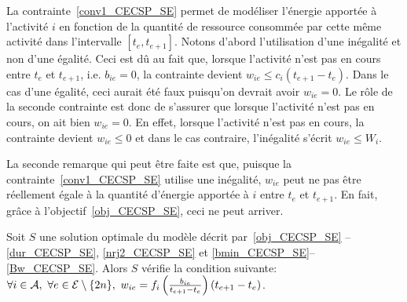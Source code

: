 La contrainte~\eqref{conv1_CECSP_SE} permet de modéliser l'énergie
apportée à l'activité $i$ en fonction de la quantité de ressource
consommée par cette même activité dans l'intervalle
$[t_e,t_{e+1}]$. Notons d'abord l'utilisation d'une inégalité et non
d'une égalité. Ceci est dû au fait que, lorsque l'activité n'est pas
en cours entre $t_e$ et $t_{e+1}$, i.e. $b_{ie}=0$, la contrainte
devient $w_{ie} \le c_i(t_{e+1}-t_e)$. Dans le cas d'une égalité, ceci
aurait été faux puisqu'on devrait avoir $w_{ie}=0$. Le rôle de la
seconde contrainte est donc de s'assurer que lorsque l'activité n'est
pas en cours, on ait bien $w_{ie}=0$. En effet, lorsque l'activité
n'est pas en cours, la contrainte devient $w_{ie}\le 0$ et dans le cas
contraire, l'inégalité s'écrit $w_{ie} \le W_i$.

La seconde remarque qui peut être faite est que, puisque la
contrainte~\eqref{conv1_CECSP_SE} utilise une inégalité, $w_{ie}$ peut
ne pas être réellement égale à la quantité d'énergie apportée à $i$
entre $t_e$ et $t_{e+1}$. En fait, grâce à
l'objectif~\eqref{obj_CECSP_SE}, ceci ne peut arriver.

\begin{theo}
  \label{th:conv}
  Soit $S$ une solution optimale du modèle décrit
  par~\eqref{obj_CECSP_SE} -- \eqref{dur_CECSP_SE},
  \eqref{nrj2_CECSP_SE} et
  \eqref{bmin_CECSP_SE}--\eqref{Bw_CECSP_SE}. Alors $S$ vérifie la
  condition suivante: $\forall i \in {\cal A},\ \forall e \in {\cal E}\setminus\{2n\},\
  w_{ie}=f_i\left(\frac{b_{ie}}{t_{e+1}-t_e}\right)(t_{e+1}-t_e)$.
\end{theo}

